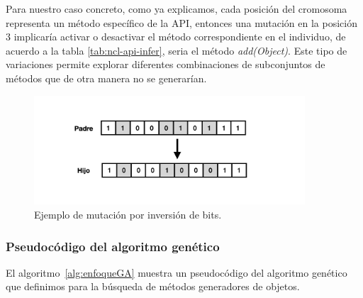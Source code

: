 Para nuestro caso concreto, como ya explicamos, cada posición del cromosoma representa un método específico de la API, entonces una mutación en la posición 3 implicaría activar o desactivar el método
correspondiente en el individuo, de acuerdo a la tabla \ref{tab:ncl-api-infer}, seria el método \emph{add(Object)}.
Este tipo de variaciones permite explorar diferentes combinaciones de subconjuntos de métodos que de otra manera no se generarían.  

\begin{figure}
    \centering
    \includegraphics[width=0.9\textwidth]{images/mutation.png}
    \caption{Ejemplo de mutación por inversión de bits.}
    \label{fig:mutation}
    \end{figure}
\subsubsection{Pseudocódigo del algoritmo genético}

El algoritmo~\ref{alg:enfoqueGA} muestra un pseudocódigo del algoritmo genético que definimos para la búsqueda de métodos generadores de objetos.


